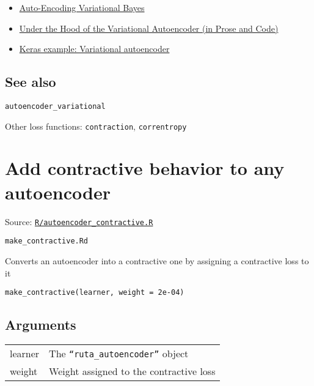 \begin{itemize}
\item
  \href{https://arxiv.org/abs/1312.6114}{Auto-Encoding Variational
  Bayes}
\item
  \href{http://blog.fastforwardlabs.com/2016/08/22/under-the-hood-of-the-variational-autoencoder-in.html}{Under
  the Hood of the Variational Autoencoder (in Prose and Code)}
\item
  \href{https://keras.rstudio.com/articles/examples/variational_autoencoder.html}{Keras
  example: Variational autoencoder}
\end{itemize}

\hypertarget{see-also}{\subsection{\texorpdfstring{\protect\hyperlink{see-also}{}See
also}{See also}}\label{see-also}}

\texttt{autoencoder\_variational}

Other loss functions: \texttt{contraction}, \texttt{correntropy}

\section{Add contractive behavior to any
autoencoder}\label{add-contractive-behavior-to-any-autoencoder}

Source:
\href{https://github.com/fdavidcl/ruta/blob/master/R/autoencoder_contractive.R}{\texttt{R/autoencoder\_contractive.R}}

\texttt{make\_contractive.Rd}

Converts an autoencoder into a contractive one by assigning a
contractive loss to it

\begin{verbatim}
make_contractive(learner, weight = 2e-04)
\end{verbatim}

\hypertarget{arguments}{\subsection{\texorpdfstring{\protect\hyperlink{arguments}{}Arguments}{Arguments}}\label{arguments}}

\begin{longtable}[c]{@{}>{\small}p{3cm}>{\raggedright}p{12.5cm}@{}}
\toprule
learner & The \texttt{``ruta\_autoencoder''} object\tabularnewline
weight & Weight assigned to the contractive loss\tabularnewline
\bottomrule
\end{longtable}

